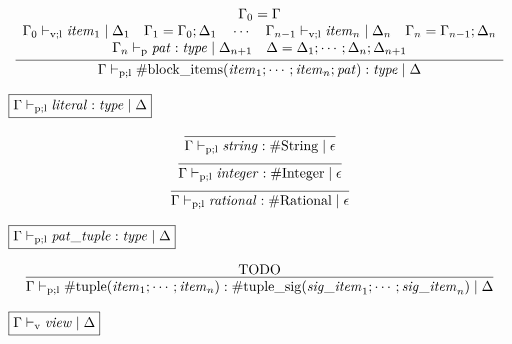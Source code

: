 \begin{gather*}
    \infer{\Gamma \vdash_{\mathrm{p}; \mathrm{l}} \mathrm{\#block\_items}(\mathit{item}_1; \cdots; \mathit{item}_n; \mathit{pat}): \mathit{type} \mid \Delta}{
        \begin{array}{c}
            \Gamma_0 = \Gamma
            \\
            \Gamma_0 \vdash_{\mathrm{v}; \mathrm{l}} \mathit{item}_1 \mid \Delta_1
            \hspace{1em}
            \Gamma_1 = \Gamma_0; \Delta_1
            \hspace{1em}
            \cdots
            \hspace{1em}
            \Gamma_{n - 1} \vdash_{\mathrm{v}; \mathrm{l}} \mathit{item}_n \mid \Delta_n
            \hspace{1em}
            \Gamma_n = \Gamma_{n - 1}; \Delta_n
            \\
            \Gamma_n \vdash_\mathrm{p} \mathit{pat}: \mathit{type} \mid \Delta_{n + 1}
            \hspace{1em}
            \Delta = \Delta_1; \cdots; \Delta_n; \Delta_{n + 1}
        \end{array}
    }
\end{gather*}

$\fbox{$\Gamma \vdash_{\mathrm{p}; \mathrm{l}} \mathit{literal}: \mathit{type} \mid \Delta$}$

\begin{gather*}
    \infer{\Gamma \vdash_{\mathrm{p}; \mathrm{l}} \mathit{string}: \mathrm{\#String} \mid \epsilon}{}
    \\
    \infer{\Gamma \vdash_{\mathrm{p}; \mathrm{l}} \mathit{integer}: \mathrm{\#Integer} \mid \epsilon}{}
    \\
    \infer{\Gamma \vdash_{\mathrm{p}; \mathrm{l}} \mathit{rational}: \mathrm{\#Rational} \mid \epsilon}{}
\end{gather*}

$\fbox{$\Gamma \vdash_{\mathrm{p}; \mathrm{l}} \mathit{pat\_tuple}: \mathit{type} \mid \Delta$}$

\begin{gather*}
    \infer{\Gamma \vdash_{\mathrm{p}; \mathrm{l}} \mathrm{\#tuple}(\mathit{item}_1; \cdots; \mathit{item}_n): \mathrm{\#tuple\_sig}(\mathit{sig\_item}_1; \cdots; \mathit{sig\_item}_n) \mid \Delta}{
        \text{TODO}
    }
\end{gather*}

$\fbox{$\Gamma \vdash_\mathrm{v} \mathit{view} \mid \Delta$}$

